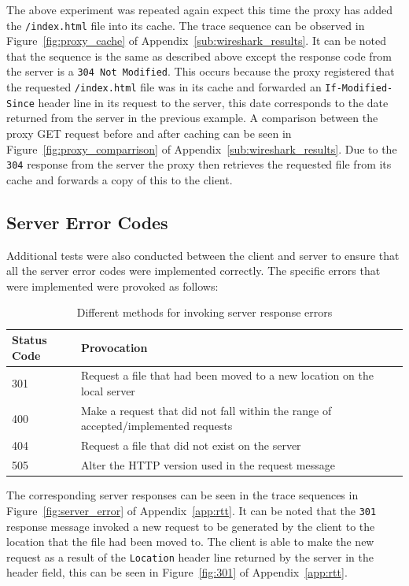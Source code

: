 \documentclass[10pt,twocolumn]{witseiepaper}
\begin{document}
		 The above experiment was repeated again expect this time the proxy has added the \texttt{/index.html} file into its cache. The trace sequence can be observed in Figure~\ref{fig:proxy_cache} of Appendix~\ref{sub:wireshark_results}. It can be noted that the sequence is the same as described above except the response code from the server is a \texttt{304 Not Modified}. This occurs because the proxy registered that the requested \texttt{/index.html} file was in its cache and forwarded an \texttt{If-Modified-Since} header line in its request to the server, this date corresponds to the date returned from the server in the previous example. A comparison between the proxy GET request before and after caching can be seen in Figure~\ref{fig:proxy_comparrison} of Appendix~\ref{sub:wireshark_results}. Due to the \texttt{304} response from the server the proxy then retrieves the requested file from its cache and forwards a copy of this to the client.
	
	\subsection{Server Error Codes}
	
		Additional tests were also conducted between the client and server to ensure that all the server error codes were implemented correctly. The specific errors that were implemented were provoked as follows:
		
		\begin{table}[htbp]
			\centering
			\caption{Different methods for invoking server response errors}
			\label{tab:errors_responses}
			\begin{tabular}{p{}| p{}}
				\hline
				\textbf{Status Code} & \textbf{Provocation}\\ \hline
				301 & Request a file that had been moved to a new location on the local server \\
				400 & Make a request that did not fall within the range of accepted/implemented requests \\
				404 & Request a file that did not exist on the server \\
				505 & Alter the HTTP version used in the request message \\
				\hline
			\end{tabular}
		\end{table}
		
		The corresponding server responses can be seen in the trace sequences in Figure~\ref{fig:server_error} of Appendix~\ref{app:rtt}. It can be noted that the \texttt{301} response message invoked a new request to be generated by the client to the location that the file had been moved to. The client is able to make the new request as a result of the \texttt{Location} header line returned by the server in the header field, this can be seen in Figure~\ref{fig:301} of Appendix~\ref{app:rtt}.
	
\end{document}
